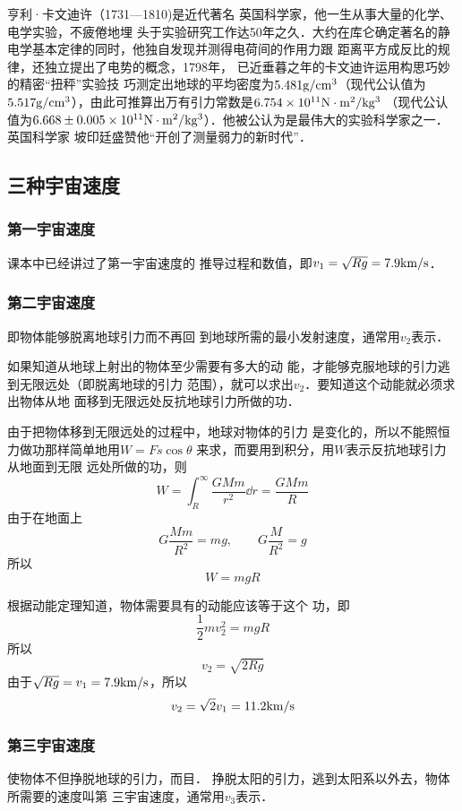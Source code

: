 亨利·卡文迪许（1731—1810)是近代著名
英国科学家，他一生从事大量的化学、电学实验，不疲倦地埋
头于实验研究工作达50年之久．大约在库仑确定著名的静
电学基本定律的同时，他独自发现并测得电荷间的作用力跟
距离平方成反比的规律，还独立提出了电势的概念，1798年，
已近垂暮之年的卡文迪许运用构思巧妙的精密“扭秤”实验技
巧测定出地球的平均密度为$5.481{\rm g/cm^3}$（现代公认值为
$5.517{\rm g/cm^3}$），由此可推算出万有引力常数是$6.754\times10^{11}{\rm N\cdot m^2/kg^3}$
（现代公认值为$6.668\pm 0.005\times10^{11}{\rm N\cdot m^2/kg^3}$）．他被公认为是最伟大的实验科学家之一．英国科学家
坡印廷盛赞他“开创了测量弱力的新时代”．

\subsection{三种宇宙速度}


\subsubsection{第一宇宙速度} 课本中已经讲过了第一宇宙速度的
推导过程和数值，即$v_1=\sqrt{Rg}=7.9{\rm km/s}$．

\subsubsection{第二宇宙速度} 即物体能够脱离地球引力而不再回
到地球所需的最小发射速度，通常用$v_2$表示．

如果知道从地球上射出的物体至少需要有多大的动
能，才能够克服地球的引力逃到无限远处（即脱离地球的引力
范围），就可以求出$v_2$．要知道这个动能就必须求出物体从地
面移到无限远处反抗地球引力所做的功．

由于把物体移到无限远处的过程中，地球对物体的引力
是变化的，所以不能照恒力做功那样简单地用$W=Fs\cos\theta$
来求，而要用到积分，用$W$表示反抗地球引力从地面到无限
远处所做的功，则
\[W=\int^{\infty}_R \frac{GMm}{r^2}\dd r=\frac{GMm}{R} \]
由于在地面上
\[G\frac{Mm}{R^2}=mg,\qquad G\frac{M}{R^2}=g\]
所以
\[W=mgR\]

根据动能定理知道，物体需要具有的动能应该等于这个
功，即
\[\frac{1}{2}mv^2_2=mgR\]
所以
\[v_2=\sqrt{2Rg}\]
由于$\sqrt{Rg}=v_1=7.9{\rm km/s}$，所以
\[v_2=\sqrt{2}v_1=11.2{\rm km/s}\]

\subsubsection{第三宇宙速度}

使物体不但挣脱地球的引力，而目．
挣脱太阳的引力，逃到太阳系以外去，物体所需要的速度叫第
三宇宙速度，通常用$v_3$表示．

